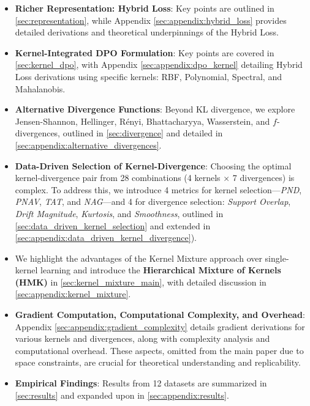 \begin{itemize}[leftmargin=15pt,nolistsep]

\item[\ding{93}] \textbf{Richer Representation: Hybrid Loss}: Key points are outlined in \cref{sec:representation}, while Appendix \cref{sec:appendix:hybrid_loss} provides detailed derivations and theoretical underpinnings of the Hybrid Loss.


\item[\ding{93}] \textbf{Kernel-Integrated DPO Formulation}: Key points are covered in \cref{sec:kernel_dpo}, with Appendix \cref{sec:appendix:dpo_kernel} detailing Hybrid Loss derivations using specific kernels: RBF, Polynomial, Spectral, and Mahalanobis.


\item[\ding{93}] \textbf{Alternative Divergence Functions}: Beyond KL divergence, we explore Jensen-Shannon, Hellinger, Rényi, Bhattacharyya, Wasserstein, and $f$-divergences, outlined in \cref{sec:divergence} and detailed in \cref{sec:appendix:alternative_divergences}.

\item[\ding{93}] \textbf{Data-Driven Selection of Kernel-Divergence}: Choosing the optimal kernel-divergence pair from 28 combinations (4 kernels × 7 divergences) is complex. To address this, we introduce 4 metrics for kernel selection—\textit{PND}, \textit{PNAV}, \textit{TAT}, and \textit{NAG}—and 4 for divergence selection: \textit{Support Overlap}, \textit{Drift Magnitude}, \textit{Kurtosis}, and \textit{Smoothness}, outlined in \cref{sec:data_driven_kernel_selection} and extended in \cref{sec:appendix:data_driven_kernel_divergence}).

\item[\ding{93}] We highlight the advantages of the Kernel Mixture approach over single-kernel learning and introduce the \textbf{Hierarchical Mixture of Kernels (HMK)} in \cref{sec:kernel_mixture_main}, with detailed discussion in \cref{sec:appendix:kernel_mixture}.


\item[\ding{93}] \textbf{Gradient Computation, Computational Complexity, and Overhead}: Appendix \cref{sec:appendix:gradient_complexity} details gradient derivations for various kernels and divergences, along with complexity analysis and computational overhead. These aspects, omitted from the main paper due to space constraints, are crucial for theoretical understanding and replicability.


\item[\ding{93}] \textbf{Empirical Findings}: Results from 12 datasets are summarized in \cref{sec:results} and expanded upon in \cref{sec:appendix:results}.


\end{itemize}
